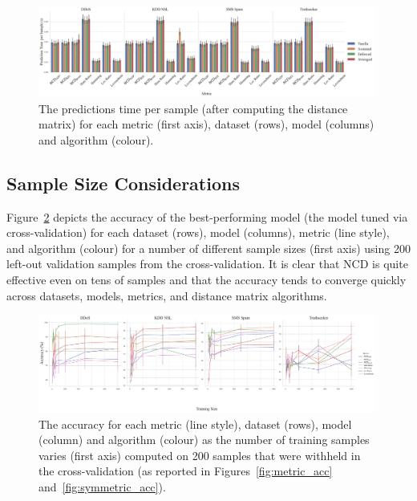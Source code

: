 \documentclass[preprint,12pt]{article}
\begin{document}
\begin{figure}[H]
    \centering
    \includegraphics[width=0.99\textwidth]{images/pred_time_vs_symmetry.pdf}
    \caption{The predictions time per sample (after computing the distance matrix) for each metric (first axis), dataset (rows), model (columns) and algorithm (colour).}
    \label{fig:pred_time}
\end{figure}



\subsection{Sample Size Considerations}

Figure~\ref{fig:sample_size} depicts the accuracy of the best-performing model (the model tuned via cross-validation) for each dataset (rows), model (columns), metric (line style), and algorithm (colour) for a number of different sample sizes (first axis) using 200 left-out validation samples from the cross-validation.
It is clear that NCD is quite effective even on tens of samples and that the accuracy tends to converge quickly across datasets, models, metrics, and distance matrix algorithms.

\begin{figure}[h]
    \centering
    \includegraphics[width=0.99\textwidth]{images/accuracy_vs_sample_size_vs_metric.pdf}
    \caption{The accuracy for each metric (line style), dataset (rows), model (column) and algorithm (colour) as the number of training samples varies (first axis) computed on 200 samples that were withheld in the cross-validation (as reported in Figures~\ref{fig:metric_acc} and~\ref{fig:symmetric_acc}).}
    \label{fig:sample_size}
\end{figure}
\end{document}
